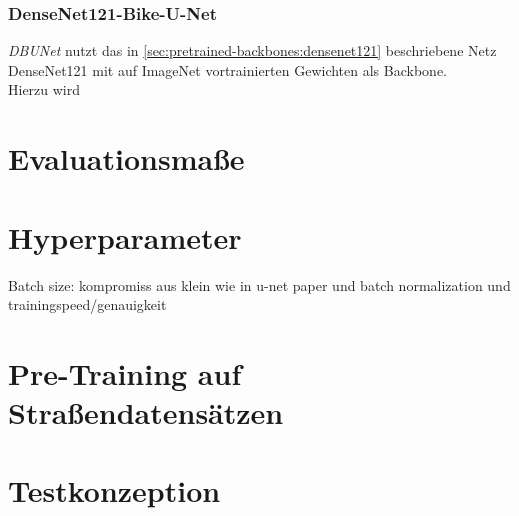 \subsubsection{DenseNet121-Bike-U-Net}

\textit{\ac{DBUNet}} nutzt das in \autoref{sec:pretrained-backbones:densenet121} beschriebene Netz DenseNet121 
mit auf ImageNet vortrainierten Gewichten als Backbone. \\
Hierzu wird


\section{Evaluationsmaße}


\section{Hyperparameter}
Batch size: kompromiss aus klein wie in u-net paper und batch normalization und trainingspeed/genauigkeit

\section{Pre-Training auf Straßendatensätzen} \label{sec:pre-training-roads}


\section{Testkonzeption}





